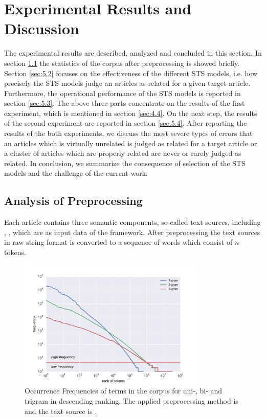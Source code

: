 
\section{Experimental Results and Discussion}
\label{sec:5}

The experimental results are described, analyzed and concluded in this section. In section \ref{sec:5.1} the statistics of the corpus after preprocessing is showed briefly. Section \ref{sec:5.2} focuses on the effectiveness of the different STS models, i.e. how precisely the STS models judge an articles as related for a given target article. Furthermore, the operational performance of the STS models is reported in section \ref{sec:5.3}. The above three parts concentrate on the results of the first experiment, which is mentioned in section \ref{sec:4.4}. On the next step, the results of the second experiment are reported in section \ref{sec:5.4}. After reporting the results of the both experiments, we discuss the most severe types of errors that an articles which is virtually unrelated is judged as related for a target article or a cluster of articles which are properly related are never or rarely judged as related. In conclusion, we summarize the consequence of selection of the STS models and the challenge of the current work. 

\bigbreak

\subsection{Analysis of Preprocessing}
\label{sec:5.1}

Each article contains three semantic components, so-called text sources, including \icontent{}, \ititle{}, \isummary{} which are as input data of the framework. After preprocessing the text sources in raw string format is converted to a sequence of words which consist of $n$ tokens. 

\begin{figure}[!htb]
    \centering
    \includegraphics[width=0.8\textwidth]{fig/freqdist}
    \caption{Occurrence Frequencies of terms in the corpus for uni-, bi- and trigram in descending ranking. The applied preprocessing method is \iSE{} and the text source is \icontent{}.}
    \label{fig:freqdist}
\end{figure}

